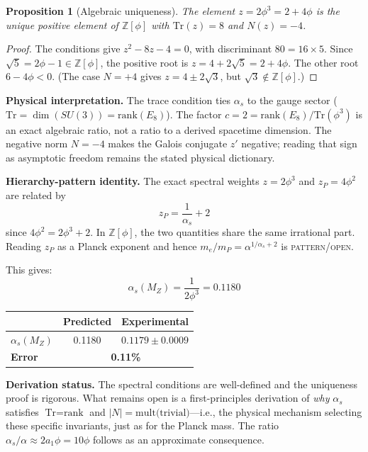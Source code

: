 \documentclass[12pt,a4paper]{article}
\newtheorem{proposition}{Proposition}
\theoremstyle{definition}
\begin{document}
\begin{proposition}[Algebraic uniqueness]
The element $z = 2\phi^3 = 2 + 4\phi$ is the unique positive element of $\mathbb{Z}[\phi]$ with $\mathrm{Tr}(z) = 8$ and $N(z) = -4$.
\end{proposition}

\begin{proof}
The conditions give $z^2 - 8z - 4 = 0$, with discriminant $80 = 16 \times 5$.  Since $\sqrt{5} = 2\phi-1 \in \mathbb{Z}[\phi]$, the positive root is $z = 4 + 2\sqrt{5} = 2 + 4\phi$.  The other root $6 - 4\phi < 0$.  (The case $N = +4$ gives $z = 4 \pm 2\sqrt{3}$, but $\sqrt{3} \notin \mathbb{Z}[\phi]$.)
\end{proof}

\textbf{Physical interpretation.} The trace condition ties $\alpha_s$ to the gauge sector ($\text{Tr} = \dim(SU(3)) = \text{rank}(E_8)$).  The factor $c=2=\text{rank}(E_8)/\text{Tr}(\phi^3)$ is an exact algebraic ratio, not a ratio to a derived spacetime dimension.  The negative norm $N=-4$ makes the Galois conjugate $z'$ negative; reading that sign as asymptotic freedom remains the stated physical dictionary.

\textbf{Hierarchy-pattern identity.}  The exact spectral weights $z=2\phi^3$ and $z_P=4\phi^2$ are related by
\begin{equation}
\boxed{z_P = \frac{1}{\alpha_s} + 2}
\label{eq:hierarchy_identity}
\end{equation}
since $4\phi^2=2\phi^3+2$.  In $\mathbb Z[\phi]$, the two quantities share the same irrational part.  Reading $z_P$ as a Planck exponent and hence $m_e/m_P=\alpha^{1/\alpha_s+2}$ is \textsc{pattern/open}.

This gives:
\begin{equation}
\boxed{\alpha_s(M_Z) = \frac{1}{2\phi^3} = 0.1180}
\label{eq:alpha_s}
\end{equation}
\begin{center}
\begin{tabular}{lcc}
\toprule
& \textbf{Predicted} & \textbf{Experimental} \\
\midrule
$\alpha_s(M_Z)$ & 0.1180 & $0.1179 \pm 0.0009$ \\
\textbf{Error} & \multicolumn{2}{c}{\textbf{0.11\%}} \\
\bottomrule
\end{tabular}
\end{center}

\textbf{Derivation status.} The spectral conditions are well-defined and the uniqueness proof is rigorous. What remains open is a first-principles derivation of \emph{why} $\alpha_s$ satisfies $\text{Tr} = \text{rank}$ and $|N| = \text{mult(trivial)}$---i.e., the physical mechanism selecting these specific invariants, just as for the Planck mass. The ratio $\alpha_s/\alpha \approx 2a_1\phi = 10\phi$ follows as an approximate consequence.
\end{document}

